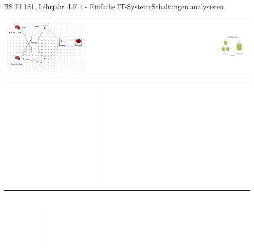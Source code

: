 \documentclass[oneside,openany,headings=optiontotoc,11pt,numbers=noenddot]{scrreprt}
\begin{document}
	\begin{worksheet}{BS FI 18}{1. Lehrjahr, LF 4 - Einfache IT-Systeme}{Schaltungen analysieren}
		\begin{framed}
			\noindent
			\begin{tabularx}{\textwidth}{Xr}
				\includegraphics[width=0.65\textwidth]{../99_Bilder/behaelter.jpg} & \includegraphics[width=0.25\textwidth]{../99_Bilder/airport-logik.jpg}
			\end{tabularx}
		\end{framed}
		\setlength{\leftskip}{-0.4cm}
		\begin{tabularx}{\textwidth}{|X|X|}
			\hline
			\footnotesize{\textbf{\color{codegray}{Ein- und Ausgangsvariablen}}} & \footnotesize{\textbf{\color{codegray}{Funktionstabelle:}}}\\
 			\includegraphics[width=0.4\textwidth]{../../empty.jpg}&\\
			\hline
		\end{tabularx}
		\begin{framed}
			\footnotesize{\textbf{\color{codegray}{Beschreibung:}}}\\
			\includegraphics[width=0.15\textwidth]{../../empty.jpg}

\end{framed}
\end{worksheet}
\end{document}
